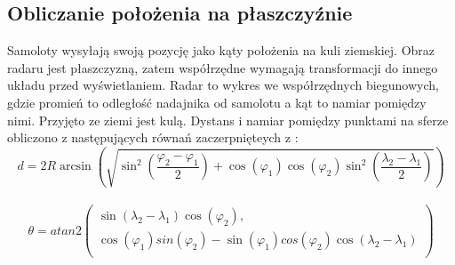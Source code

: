 \documentclass[eng,printmode]{mgr}
\begin{document}
\subsection*{Obliczanie położenia na płaszczyźnie}
Samoloty wysyłają swoją pozycję jako kąty położenia na kuli ziemskiej. Obraz radaru jest płaszczyzną, zatem współrzędne wymagają transformacji do innego układu przed wyświetlaniem. Radar to wykres we współrzędnych biegunowych, gdzie promień to odległość nadajnika od samolotu a kąt to namiar pomiędzy nimi. Przyjęto ze ziemi jest kulą.
Dystans i namiar pomiędzy punktami na sferze obliczono z następujących równań zaczerpnięteych z \cite{posCalc}:
\\


\begin{equation}
d = 2R\arcsin\left(\sqrt{\sin^2\left(\frac{\varphi_2 - \varphi_1}{2}\right)
+ \cos\left(\varphi_1\right)\cos\left(\varphi_2\right)
\sin^2\left(\frac{\lambda_2 - \lambda_1}{2}\right)}\right) \label{eq:dystans}
\end{equation}
\\

\begin{equation}
\renewcommand*{\arraystretch}{1.3}
\theta = atan2\left( \begin{array}{ll}
\sin\left(\lambda_2 - \lambda_1\right)\cos\left(\varphi_2\right),\\
\cos\left(\varphi_1\right)sin\left(\varphi_2\right)-
\sin\left(\varphi_1\right)cos\left(\varphi_2\right)
\cos\left(\lambda_2 - \lambda_1\right)\\
\end{array}
\right)
\end{equation}
\end{document}
